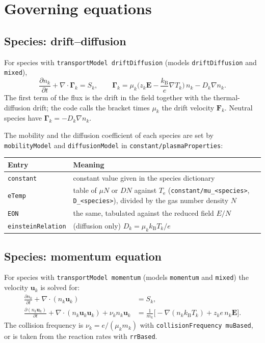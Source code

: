 \documentclass[11pt,a4paper]{article}
\newcommand{\kw}[1]{\texttt{#1}}
\newcommand{\bG}{\boldsymbol{\Gamma}}
\newcommand{\bE}{\mathbf{E}}
\newcommand{\bu}{\mathbf{u}}
\newcommand{\kB}{k_\mathrm{B}}
\newcommand{\Te}{T_\mathrm{e}}
\newcommand{\pd}[2]{\frac{\partial #1}{\partial #2}}
\begin{document}
\section{Governing equations}

\subsection{Species: drift--diffusion}

For species with \kw{transportModel driftDiffusion} (models \kw{driftDiffusion}
and \kw{mixed}),
\begin{equation}
\pd{n_k}{t} + \nabla\cdot\bG_k = S_k ,
\qquad
\bG_k = \mu_k\Big(z_k\bE - \frac{\kB}{e}\nabla T_k\Big)\,n_k - D_k\nabla n_k .
\label{eq:dd}
\end{equation}
The first term of the flux is the drift in the field together with the
thermal-diffusion drift; the code calls the bracket times $\mu_k$ the drift
velocity $\mathbf{F}_k$. Neutral species have $\bG_k=-D_k\nabla n_k$.

The mobility and the diffusion coefficient of each species are set by
\kw{mobilityModel} and \kw{diffusionModel} in \kw{constant/plasmaProperties}:
\begin{center}
\begin{tabular}{@{}lL{10.5cm}@{}}
\toprule
Entry & Meaning \\
\midrule
\kw{constant} & constant value given in the species dictionary \\
\kw{eTemp} & table of $\mu N$ or $DN$ against $\Te$ (\kw{constant/mu\_<species>}, \kw{D\_<species>}), divided by the gas number density $N$ \\
\kw{EON} & the same, tabulated against the reduced field $E/N$ \\
\kw{einsteinRelation} & (diffusion only) $D_k=\mu_k \kB T_k/e$ \\
\bottomrule
\end{tabular}
\end{center}

\subsection{Species: momentum equation}

For species with \kw{transportModel momentum} (models \kw{momentum} and
\kw{mixed}) the velocity $\bu_k$ is solved for:
\begin{align}
\pd{n_k}{t} + \nabla\cdot(n_k\bu_k) &= S_k , \\
\pd{(n_k\bu_k)}{t} + \nabla\cdot(n_k\bu_k\bu_k) + \nu_k n_k\bu_k
  &= \frac{1}{m_k}\Big[-\nabla(n_k\kB T_k) + z_k e\,n_k\bE\Big] .
\end{align}
The collision frequency is $\nu_k=e/(\mu_k m_k)$ with
\kw{collisionFrequency muBased}, or is taken from the reaction rates with
\kw{rrBased}.
\end{document}
